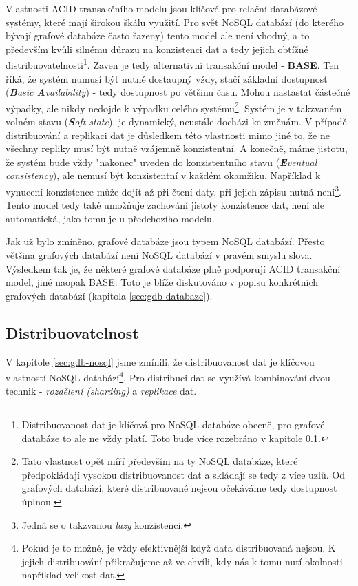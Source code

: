 {%
Vlastnosti ACID transakčního modelu jsou klíčové pro relační databázové systémy, které mají širokou škálu využití. Pro svět NoSQL databází (do kterého bývají grafové databáze často řazeny) tento model ale není vhodný, a to především kvůli silnému důrazu na konzistenci dat a tedy jejich obtížné distribuovatelnosti\footnote{Distribuovanost dat je klíčová pro NoSQL databáze obecně, pro grafové databáze to ale ne vždy platí. Toto bude více rozebráno v kapitole \ref{sec:gdb-distribution}.}. Zaven je tedy alternativní transakční model - \textbf{BASE}. Ten říká, že systém numusí být nutně dostaupný vždy, stačí základní dostupnost (\textit{\textbf{B}asic \textbf{A}vailability}) - tedy dostupnost po většinu času. Mohou nastastat částečné výpadky, ale nikdy nedojde k výpadku celého systému\footnote{Tato vlastnost opět míří především na ty NoSQL databáze, které předpokládají vysokou distribuovanost dat a skládají se tedy z více uzlů. Od grafových databází, které distribuované nejsou očekáváme tedy dostupnost úplnou.}. Systém je v takzvaném volném stavu (\textit{\textbf{S}oft-state}), je dynamický, neustále docházi ke změnám. V případě distribuování a replikaci dat je důsledkem této vlastnosti mimo jiné to, že ne všechny repliky musí být nutně vzájemně konzistentní. A konečně, máme jistotu, že systém bude vždy "nakonec" uveden do konzistentního stavu (\textit{\textbf{E}ventual consistency}), ale nemusí být konzistentní v každém okamžiku. Například k vynucení konzistence může dojít až při čtení daty, při jejich zápisu nutná není\footnote{Jedná se o takzvanou \textit{lazy} konzistenci.}. Tento model tedy také umožňuje zachování jistoty konzistence dat, není ale automatická, jako tomu je u předchozího modelu. \cite{Sadalage13}

Jak už bylo zmíněno, grafové databáze jsou typem NoSQL databází. Přesto většina grafových databází není NoSQL databází v pravém smyslu slova. Výsledkem tak je, že některé grafové databáze plně podporují ACID transakční model, jiné naopak BASE. Toto je blíže diskutováno v popisu konkrétních grafových databází (kapitola \ref{sec:gdb-databaze}).



\subsection{Distribuovatelnost}
\label{sec:gdb-distribution}
V kapitole \ref{sec:gdb-nosql} jsme zmínili, že distribuovanost dat je klíčovou vlastností NoSQL databází\footnote{Pokud je to možné, je vždy efektivnější když data distribuovaná nejsou. K jejich distribuování přikračujeme až ve chvíli, kdy nás k tomu nutí okolnosti - například velikost dat.}. Pro distribuci dat se využívá kombinování dvou technik - \textit{rozdělení (sharding)} a \textit{replikace} dat. 

}
